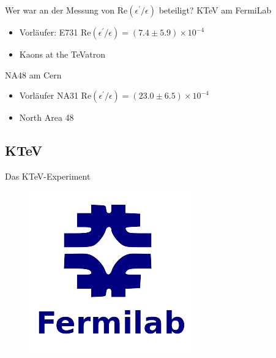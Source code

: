 \documentclass[aspectratio=1610, professionalfonts, 9pt, t]{beamer}
\begin{document}
  \begin{frame}{Wer war an der Messung von Re$(\epsilon^{\prime} / \epsilon)$ beteiligt?}
    KTeV am FermiLab
    \begin{itemize}
      \item Vorläufer: E731 \rightarrow Re$(\epsilon^{\prime} / \epsilon) = (7.4\pm5.9) \times10^{-4}$
      \item Kaons at the TeVatron
    \end{itemize}
    NA48 am Cern
    \begin{itemize}
      \item Vorläufer NA31 \rightarrow Re$(\epsilon^{\prime} / \epsilon) = (23.0\pm6.5) \times10^{-4}$
      \item North Area 48
    \end{itemize}
  \end{frame}

  \subsection{KTeV}

  \begin{frame}{Das KTeV-Experiment}
    \begin{figure}
      \includegraphics[height=0.8\textheight]{Images/rip.png}
    \end{figure}
  \end{frame}
\end{document}
